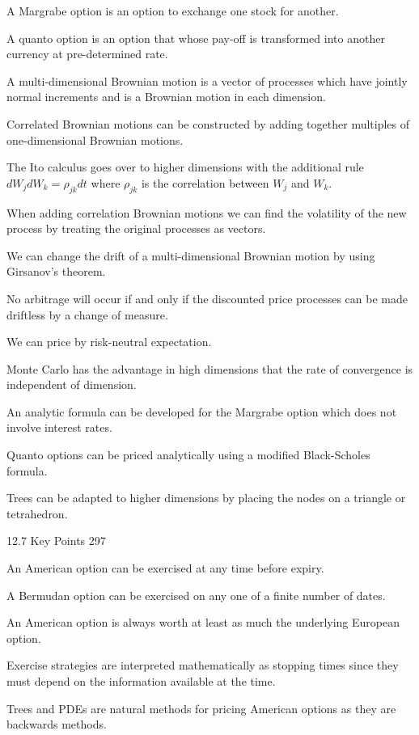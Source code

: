 A Margrabe option is an option to exchange one stock for another.

A quanto option is an option that whose pay-off is transformed into another currency at pre-determined rate.

A multi-dimensional Brownian motion is a vector of processes which have jointly normal increments and is a Brownian motion in each dimension.

Correlated Brownian motions can be constructed by adding together multiples of one-dimensional Brownian motions.

The Ito calculus goes over to higher dimensions with the additional rule $dW_j dW_k = \rho_{jk} dt$ where $\rho_{jk}$ is the correlation between $W_j$ and $W_k$.

When adding correlation Brownian motions we can find the volatility of the new process by treating the original processes as vectors.

We can change the drift of a multi-dimensional Brownian motion by using Girsanov's theorem.

No arbitrage will occur if and only if the discounted price processes can be made driftless by a change of measure.

We can price by risk-neutral expectation.

Monte Carlo has the advantage in high dimensions that the rate of convergence is independent of dimension.

An analytic formula can be developed for the Margrabe option which does not involve interest rates.

Quanto options can be priced analytically using a modified Black-Scholes formula.

Trees can be adapted to higher dimensions by placing the nodes on a triangle or tetrahedron.

12.7 Key Points 297

An American option can be exercised at any time before expiry.

A Bermudan option can be exercised on any one of a finite number of dates.

An American option is always worth at least as much the underlying European option.

Exercise strategies are interpreted mathematically as stopping times since they must depend on the information available at the time.

Trees and PDEs are natural methods for pricing American options as they are backwards methods.


